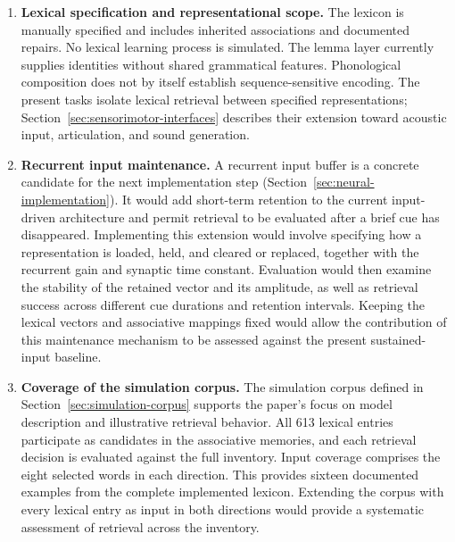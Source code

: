 \begin{enumerate}
\item \textbf{Lexical specification and representational scope.} The lexicon is manually specified and includes inherited associations and documented repairs. No lexical learning process is simulated. The lemma layer currently supplies identities without shared grammatical features. Phonological composition does not by itself establish sequence-sensitive encoding. The present tasks isolate lexical retrieval between specified representations; Section~\ref{sec:sensorimotor-interfaces} describes their extension toward acoustic input, articulation, and sound generation.

\item \textbf{Recurrent input maintenance.} A recurrent input buffer is a concrete candidate for the next implementation step (Section~\ref{sec:neural-implementation}). It would add short-term retention to the current input-driven architecture and permit retrieval to be evaluated after a brief cue has disappeared. Implementing this extension would involve specifying how a representation is loaded, held, and cleared or replaced, together with the recurrent gain and synaptic time constant. Evaluation would then examine the stability of the retained vector and its amplitude, as well as retrieval success across different cue durations and retention intervals. Keeping the lexical vectors and associative mappings fixed would allow the contribution of this maintenance mechanism to be assessed against the present sustained-input baseline.

\item \textbf{Coverage of the simulation corpus.} The simulation corpus defined in Section~\ref{sec:simulation-corpus} supports the paper's focus on model description and illustrative retrieval behavior. All 613 lexical entries participate as candidates in the associative memories, and each retrieval decision is evaluated against the full inventory. Input coverage comprises the eight selected words in each direction. This provides sixteen documented examples from the complete implemented lexicon. Extending the corpus with every lexical entry as input in both directions would provide a systematic assessment of retrieval across the inventory.


\end{enumerate}
